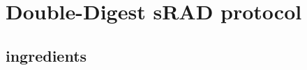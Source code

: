 
\graphicspath{
    {/Users/Claudius/Documents/PhD/THESIS/kks32/LaTeX/Appendix1/}
    }

\section{Double-Digest sRAD protocol}
\label{ch:ddRAD_protocol}

\subsection{ingredients}

